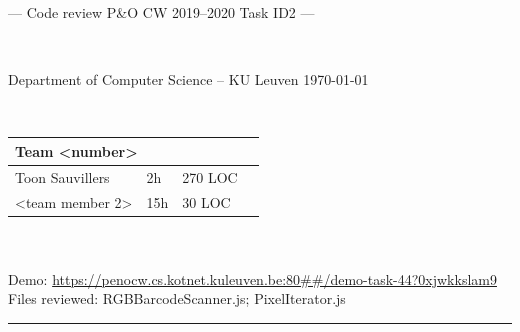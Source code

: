 \documentclass[a4paper,11pt]{article}
\begin{document}
\noindent
\colorbox[HTML]{52BDEC}{\bfseries\parbox{\textwidth}{\centering\large
  --- Code review P\&O CW 2019--2020 Task ID2 ---
}}
\\[-1mm]
\colorbox[HTML]{00407A}{\bfseries\color{white}\parbox{\textwidth}{
  Department of Computer Science -- KU Leuven
  \hfill
  \today
}}
\\

\smallskip

\noindent
\begin{tabular}{*4l}
\toprule
\multicolumn{3}{l}{\large\textbf{Team <number>}} \\
\midrule
Toon Sauvillers & 2h & 270 LOC \\ %
<team member 2> & 15h & 30 LOC \\
\bottomrule
\hline
\end{tabular}\\
\\
Demo: \url{https://penocw.cs.kotnet.kuleuven.be:80##/demo-task-44?0xjwkkslam9} \\
Files reviewed: RGBBarcodeScanner.js; PixelIterator.js	

\noindent
{\color[HTML]{52BDEC} \rule{\linewidth}{1mm} }

\smallskip
\end{document}
